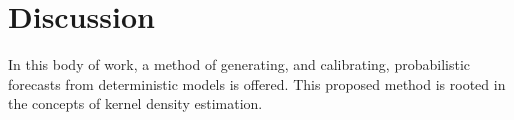 

\chapter{Discussion}
\label{discussion}

In this body of work, a method of generating, and calibrating, probabilistic forecasts from deterministic models is offered.
This proposed method is rooted in the concepts of kernel density estimation.
